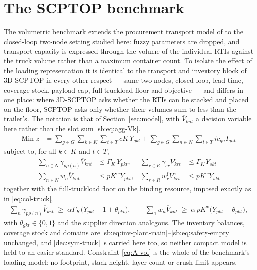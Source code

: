 \section{The SCPTOP benchmark}
\label{appendix:A}

The volumetric benchmark extends the procurement transport model of
\autocite{Diaz-Madronero2014AChain} to the closed-loop two-node
setting studied here: fuzzy parameters are dropped, and transport
capacity is expressed through the volume of the individual RTIs against
the truck volume rather than a maximum container count. To isolate the effect of the loading
representation it is identical to the transport and inventory block of
3D-SCPTOP in every other respect --- same two nodes, closed loop, lead
time, coverage stock, payload cap, full-truckload floor and objective
--- and differs in one place: where 3D-SCPTOP asks whether the RTIs can
be stacked and placed on the floor, SCPTOP asks only whether their
volumes sum to less than the trailer's. The notation is that of
Section~\ref{sec:model}, with $\overline{V}_{knt}$ a decision variable
here rather than the slot sum \eqref{sb:eq:agg-Vk}.
\begin{align}
\text{Min } z
&= \sum_{g\in G}\sum_{k\in K}\sum_{t\in T} cK\,Y_{gkt}
 + \sum_{g\in G}\sum_{n\in N}\sum_{t\in T} ic_{gn}I_{gnt}
 \label{eq:A-obj}
\end{align}
subject to, for all $k\in K$ and $t\in T$,
\begin{align}
\sum_{n\in N}\gamma_{p\rho(n)}\overline{V}_{knt} &\le \Gamma_{K}\,Y_{pkt},
 & \sum_{r\in R}\gamma_{sr}V^{\mathrm{e}}_{krt} &\le \Gamma_{K}\,Y_{skt}
 \label{eq:A-vol}\\
\sum_{n\in N}w_{n}\overline{V}_{knt} &\le pK^{w}Y_{pkt},
 & \sum_{r\in R}w^{\mathrm{f}}_{r}V^{\mathrm{e}}_{krt} &\le pK^{w}Y_{skt}
 \label{eq:A-weight}
\end{align}
together with the full-truckload floor on the binding resource, imposed
exactly as in \eqref{eq:col-truck},
\begin{align}
\sum_{n}\gamma_{p\rho(n)}\overline{V}_{knt} \;\ge\; \alpha\Gamma_{K}\bigl(Y_{pkt}-1+\theta_{pkt}\bigr),
\qquad
\sum_{n}w_{n}\overline{V}_{knt} \;\ge\; \alpha\,pK^{w}\bigl(Y_{pkt}-\theta_{pkt}\bigr),
\label{eq:A-ftl}
\end{align}
with $\theta_{gkt}\in\{0,1\}$ and the supplier direction analogous. The
inventory balances, coverage stock and domains are
\eqref{sb:eq:inv-plant-main}--\eqref{sb:eq:safety-empty} unchanged, and
\eqref{dec:sym-truck} is carried here too, so neither compact model is
held to an easier standard. Constraint \eqref{eq:A-vol} is the whole of
the benchmark's loading model: no footprint, stack height, layer count
or crush limit appears.